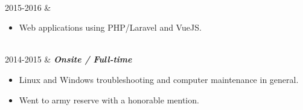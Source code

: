\documentclass[]{cv-mauri}
\begin{document}
\begin{tabularcv}
		    \\[\vspacepar]
    2015-2016   &   
            \begin{itemize}
                  	\item Web applications using PHP/Laravel and VueJS.
            \end{itemize}
                    
                    \\[\vspacepar]
	2014-2015   &   
					\textbf{\textit{Onsite / Full-time}}

			\begin{itemize}
				\item Linux and Windows troubleshooting and computer maintenance in general.
				\item Went to army reserve with a honorable mention.
			\end{itemize}
\end{tabularcv}
\end{document}
